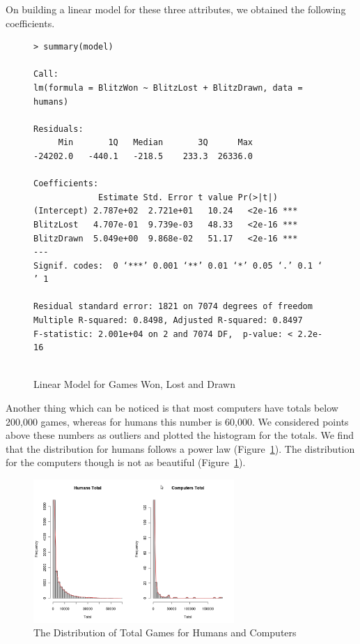 \documentclass{article}
\begin{document}
On building a linear model for these three attributes, we obtained the following coefficients.

\begin{figure}[htp]
\begin{verbatim}
> summary(model)

Call:
lm(formula = BlitzWon ~ BlitzLost + BlitzDrawn, data = humans)

Residuals:
     Min       1Q   Median       3Q      Max 
-24202.0   -440.1   -218.5    233.3  26336.0 

Coefficients:
             Estimate Std. Error t value Pr(>|t|)    
(Intercept) 2.787e+02  2.721e+01   10.24   <2e-16 ***
BlitzLost   4.707e-01  9.739e-03   48.33   <2e-16 ***
BlitzDrawn  5.049e+00  9.868e-02   51.17   <2e-16 ***
---
Signif. codes:  0 ‘***’ 0.001 ‘**’ 0.01 ‘*’ 0.05 ‘.’ 0.1 ‘ ’ 1 

Residual standard error: 1821 on 7074 degrees of freedom
Multiple R-squared: 0.8498,	Adjusted R-squared: 0.8497 
F-statistic: 2.001e+04 on 2 and 7074 DF,  p-value: < 2.2e-16 


\end{verbatim}
\caption{Linear Model for Games Won, Lost and Drawn}
\end{figure}

Another thing which can be noticed is that most computers have totals below 200,000 games, whereas for humans this number is 60,000. We considered points above these numbers as outliers and plotted the histogram for the totals. We find that the distribution for humans follows a power law (Figure~\ref{fig:totalsdistr}). The distribution for the computers though is not as beautiful (Figure~\ref{fig:totalsdistr}).\\

\begin{figure} [htp]
\begin{center}
\includegraphics[width=3in]{totals_distr.png}
\end{center}
\caption{The Distribution of Total Games for Humans and Computers}
\label{fig:totalsdistr}
\end{figure}
\end{document}
